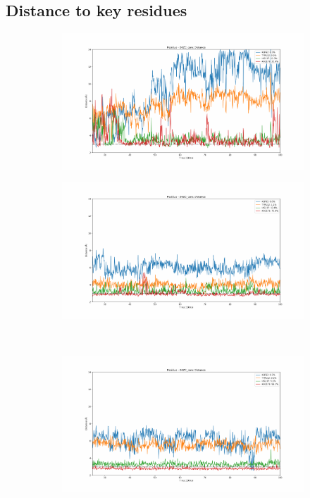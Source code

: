 \subsection{Distance to key residues}

\begin{figure}[!ht]
\centering
  \begin{subfigure}{.45\textwidth}
     \centering
     \includegraphics[width=.95\linewidth]{chapter4/2AZC_canc/2AZC_canc-dist_0.pdf}
  \end{subfigure}
  \begin{subfigure}{.45\textwidth}
     \centering
     \includegraphics[width=.95\linewidth]{chapter4/2AZC_canc/2AZC_canc-dist_1.pdf}
  \end{subfigure}
  \\
  \begin{subfigure}{.45\textwidth}
     \centering
     \includegraphics[width=.95\linewidth]{chapter4/2AZC_canc/2AZC_canc-dist_2.pdf}

\end{subfigure}
\end{figure}
